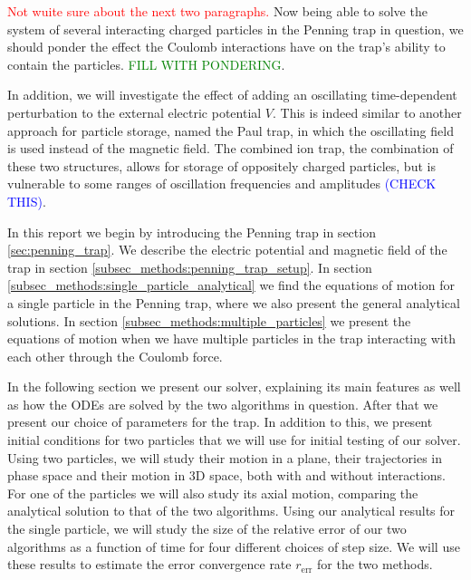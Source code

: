 \textcolor{red}{Not wuite sure about the next two paragraphs.}
Now being able to solve the system of several interacting charged particles in the Penning trap in question, we should ponder the effect the Coulomb interactions have on the trap's ability to contain the particles. 
\textcolor{green}{FILL WITH PONDERING}. 

In addition, we will investigate the effect of adding an oscillating time-dependent perturbation to the external electric potential $V$. This is indeed similar to another approach for particle storage, named the Paul trap, in which the oscillating field is used instead of the magnetic field. The combined ion trap, the combination of these two structures, allows for storage of oppositely charged particles, but is vulnerable to some ranges of oscillation frequencies and amplitudes \textcolor{blue}{(CHECK THIS)}.


In this report we begin by introducing the Penning trap in section \ref{sec:penning_trap}. We describe the electric potential and magnetic field of the trap in section \ref{subsec_methods:penning_trap_setup}. In section \ref{subsec_methods:single_particle_analytical} we find the equations of motion for a single particle in the Penning trap, where we also present the general analytical solutions. In section \ref{subsec_methods:multiple_particles} we present the equations of motion when we have multiple particles in the trap interacting with each other through the Coulomb force. 


In the following section we present our solver, explaining its main features as well as how the ODEs are solved by the two algorithms in question. After that we present our choice of parameters for the trap. In addition to this, we present initial conditions for two particles that we will use for initial testing of our solver. Using two particles, we will study their motion in a plane, their trajectories in phase space and their motion in 3D space, both with and without interactions. For one of the particles we will also study its axial motion, comparing the analytical solution to that of the two algorithms. Using our analytical results for the single particle, we will study the size of the relative error of our two algorithms as a function of time for four different choices of step size. We will use these results to estimate the error convergence rate $r_\mathrm{err}$ for the two methods. 


